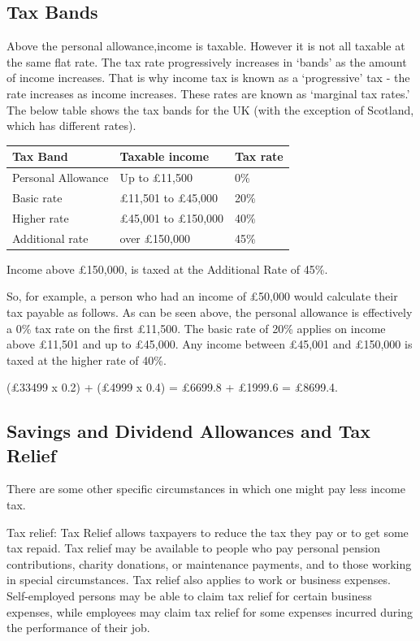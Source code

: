 \documentclass[]{tufte-handout}
\begin{document}
\hypertarget{tax-bands}{%
\subsection{Tax Bands}\label{tax-bands}}

Above the personal allowance,income is taxable. However it is not all
taxable at the same flat rate. The tax rate progressively increases in
`bands' as the amount of income increases. That is why income tax is
known as a `progressive' tax - the rate increases as income increases.
These rates are known as `marginal tax rates.' The below table shows the
tax bands for the UK (with the exception of Scotland, which has
different rates).

\begin{longtable}[]{@{}lll@{}}
\toprule
Tax Band & Taxable income & Tax rate\tabularnewline
\midrule
\endhead
Personal Allowance & Up to £11,500 & 0\%\tabularnewline
Basic rate & £11,501 to £45,000 & 20\%\tabularnewline
Higher rate & £45,001 to £150,000 & 40\%\tabularnewline
Additional rate & over £150,000 & 45\%\tabularnewline
\bottomrule
\end{longtable}

Income above £150,000, is taxed at the Additional Rate of 45\%.

So, for example, a person who had an income of £50,000 would calculate
their tax payable as follows. As can be seen above, the personal
allowance is effectively a 0\% tax rate on the first £11,500. The basic
rate of 20\% applies on income above £11,501 and up to £45,000. Any
income between £45,001 and £150,000 is taxed at the higher rate of 40\%.

(£33499 x 0.2) + (£4999 x 0.4) = £6699.8 + £1999.6 = £8699.4.

\hypertarget{savings-and-dividend-allowances-and-tax-relief}{%
\subsection{Savings and Dividend Allowances and Tax
Relief}\label{savings-and-dividend-allowances-and-tax-relief}}

There are some other specific circumstances in which one might pay less
income tax.

Tax relief: Tax Relief allows taxpayers to reduce the tax they pay or to
get some tax repaid. Tax relief may be available to people who pay
personal pension contributions, charity donations, or maintenance
payments, and to those working in special circumstances. Tax relief also
applies to work or business expenses. Self-employed persons may be able
to claim tax relief for certain business expenses, while employees may
claim tax relief for some expenses incurred during the performance of
their job.
\end{document}
